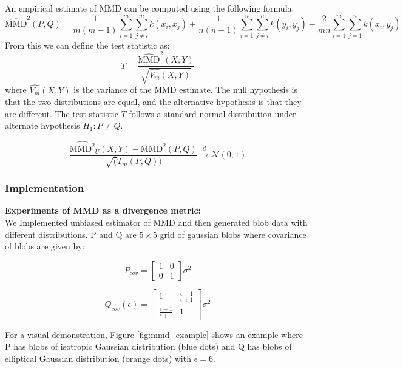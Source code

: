 \documentclass{article}
\begin{document}
An empirical estimate of MMD can be computed using the following formula:
\[
  \widehat{\text{MMD}}^2(P, Q) = \frac{1}{m(m-1)} \sum_{i=1}^{m} \sum_{j \neq i}^{m} k(x_i, x_j) + \frac{1}{n(n-1)} \sum_{i=1}^{n} \sum_{j \neq i}^{n} k(y_i, y_j) - \frac{2}{mn} \sum_{i=1}^{m} \sum_{j=1}^{n} k(x_i, y_j)
\]
From this we can define the test statistic as:
\[
  T = \frac{\widehat{\text{MMD}}^2(X,Y)}{\sqrt{\hat{V_m}(X,Y)}}
\]
where \(\widehat{V_m}(X,Y)\) is the variance of the MMD estimate. The null hypothesis is that the two distributions are equal, and the alternative hypothesis is that they are different. The test statistic \(T\) follows a standard normal distribution under alternate hypothesis \(H_1: P \neq Q\).

\[
  \frac{\widehat{\text{MMD}^2}_U(X,Y) - \text{MMD}^2(P,Q)}{\sqrt(T_m(P,Q))} \xrightarrow{d} \mathcal{N}(0,1)
\]

\subsubsection*{Implementation}
\textbf{Experiments of MMD as a divergence metric:}\\
We Implemented unbiased estimator of MMD and then generated blob data with different distributions. P and Q are \(5 \times 5\) grid of gaussian blobs where covariance of blobs are given by: \\
\begin{minipage}{0.45\linewidth}
\[
  P_{cov} = \begin{bmatrix}
    1 & 0 \\
    0 & 1
  \end{bmatrix}\sigma^2
\]
\end{minipage}
\hfill
\begin{minipage}{0.45\linewidth}
\[
  Q_{cov}(\epsilon) = \begin{bmatrix}
    1 & \frac{\epsilon-1}{\epsilon+1} \\
    \frac{\epsilon-1}{\epsilon+1} & 1
  \end{bmatrix} \sigma^2
\]
\end{minipage}

For a visual demonstration, Figure \ref{fig:mmd_example} shows an example where P has blobs of isotropic Gaussian distribution (blue dots) and Q has blobs of elliptical Gaussian distribution (orange dots) with \(\epsilon = 6\). 
\end{document}
